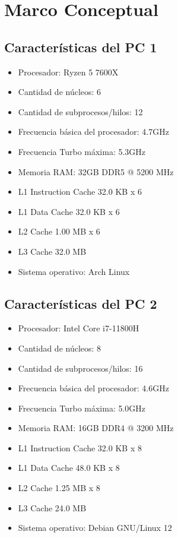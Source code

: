 
\section{Marco Conceptual}
\label{sec:Marco Conceptual}

\subsection{Características del PC 1}
\label{sec:Características del PC 1} 

\begin{itemize}
   \item Procesador: Ryzen 5 7600X
   \item Cantidad de núcleos: 6
   \item Cantidad de subprocesos/hilos: 12
   \item Frecuencia básica del procesador: 4.7GHz
   \item Frecuencia Turbo máxima: 5.3GHz
   \item Memoria RAM: 32GB DDR5 @ 5200 MHz
   \item L1 Instruction Cache          32.0 KB x 6
   \item L1 Data Cache                 32.0 KB x 6
   \item L2 Cache                      1.00 MB x 6
   \item L3 Cache                      32.0 MB
   \item Sistema operativo: Arch Linux
\end{itemize}


\subsection{Características del PC 2}
\label{sec:Características del PC 2}


\begin{itemize}
   \item Procesador: Intel Core i7-11800H
   \item Cantidad de núcleos: 8
   \item Cantidad de subprocesos/hilos: 16
   \item Frecuencia básica del procesador: 4.6GHz
   \item Frecuencia Turbo máxima: 5.0GHz
   \item Memoria RAM: 16GB DDR4 @ 3200 MHz
   \item L1 Instruction Cache          32.0 KB x 8
   \item L1 Data Cache                 48.0 KB x 8
   \item L2 Cache                      1.25 MB x 8
   \item L3 Cache                      24.0 MB

   \item Sistema operativo: Debian GNU/Linux 12
\end{itemize}


